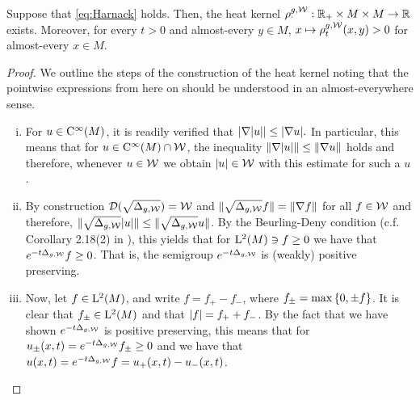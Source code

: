 \documentclass[a4paper, 12pt]{amsart}
\begin{document}
\begin{prop}
\label{prop:MainRed}
Suppose that \eqref{eq:Harnack} holds. Then, the heat
kernel $\rho^{g,\mathcal{W}}_{\cdotp}: \mathbb{R}_{+} \times M \times M \to \mathbb{R}$
exists. Moreover, for every $t > 0$ and almost-every $y \in M$,  $x\mapsto \rho^{g,\mathcal{W}}_t(x,y) > 0$ for almost-every $x \in M$.
\end{prop} 
\begin{proof}
We outline the steps of the construction of the heat kernel
noting that the pointwise expressions from here on should be
understood in an almost-everywhere sense.
\begin{enumerate}[(i)]
\item For $u \in {\rm C}^{\infty}_{\rm {}}(M)$, it is readily verified that 
	$| \nabla |u|| \leq | \nabla u|.$
	In particular, this means that 
	for $u \in {\rm C}^{\infty}_{\rm {}}(M) \cap \mathcal{W}$,
	the inequality
	$\| \nabla |u| \| \leq \| \nabla u \|$ holds
	and therefore, whenever $u \in \mathcal{W}$
	we obtain $|u| \in \mathcal{W}$ 
	with this estimate for such a $u$.

\item 	By construction ${\mathcal{D}}(\sqrt{\Delta_{g, \mathcal{W}}}) = \mathcal{W}$
	and $\| \sqrt{\Delta_{g,\mathcal{W}}} f \| = \| \nabla f \|$
	for all $f \in \mathcal{W}$ and therefore, 
	$\| \sqrt{\Delta_{g, \mathcal{W}}} |u| \| 
		\leq \| \sqrt{\Delta_{g, \mathcal{W}}} u \|$. 
	By the Beurling-Deny condition (c.f.  Corollary 2.18(2) in  \cite{El-Maati}), 
	this yields that for ${\rm L}^{2}_{\rm {}}(M) \ni f \geq 0$
	we have that  $e^{-t \Delta_{g,\mathcal{W}}} f \geq 0$. That is, the semigroup 
	$e^{-t \Delta_{g,\mathcal{W}}}$ is (weakly) positive preserving.

\item Now, let $f \in {\rm L}^{2}_{\rm {}}(M)$, and write
	$f = f_+ - f_-$, where $f_{\pm} = \max\left\{0,\pm f\right\}$.
	It is clear that $f_{\pm} \in {\rm L}^{2}_{\rm {}}(M)$
	and that $|f| = f_+ + f_-$.
	By the fact that we have shown $e^{-t\Delta_{g,\mathcal{W}}}$ 
	is positive preserving, this means that
	for $u_{\pm} (x,t) = e^{-t\Delta_{g,\mathcal{W}}} f_{\pm} \geq 0$	
	and we have that $u(x,t) = e^{-t \Delta_{g,\mathcal{W}}} f = u_+(x,t) - u_-(x,t)$.


\end{enumerate}
\end{proof}
\end{document}
